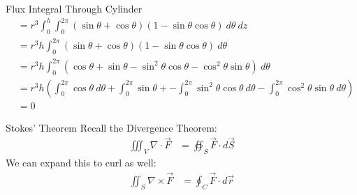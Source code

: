 \documentclass[8pt]{extarticle}
\begin{document}
\begin{problem}{Flux Integral Through Cylinder}
\begin{align*}
                                 &= r^3\int_{0}^{h}\int_{0}^{2\pi} (\sin\theta + \cos\theta)(1-\sin\theta\cos\theta)~d\theta~dz\\
                                 &= r^3h\int_{0}^{2\pi}(\sin\theta + \cos\theta)(1-\sin\theta\cos\theta)~d\theta\\
                                 &= r^3h\int_{0}^{2\pi}(\cos\theta + \sin\theta - \sin^2\theta\cos\theta - \cos^2\theta\sin\theta)~d\theta\\
                                 &= r^3h\left(\int_{0}^{2\pi}\cos\theta~d\theta + \int_{0}^{2\pi}\sin\theta + -\int_{0}^{2\pi}\sin^2\theta\cos\theta~d\theta - \int_{0}^{2\pi}\cos^2\theta\sin\theta~d\theta\right)\\
                                 &= 0
    \end{align*}
  \end{problem}
  \begin{problem}{Stokes' Theorem}
    Recall the Divergence Theorem:
    \begin{align*}
      \iiint_{V} \nabla \cdot \vec{F} &= \oiint_S \vec F \cdot d\vec{S}
    \end{align*}
    We can expand this to curl as well:
    \begin{align*}
      \iint_{S} \nabla \times \vec{F} &= \oint_{C} \vec{F} \cdot d\vec{r}
    \end{align*}
  \end{problem}
\end{document}
